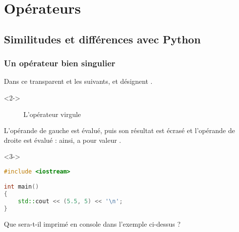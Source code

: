 \documentclass{cppcourses}
\begin{document}
\section{Opérateurs}

\subsection{Similitudes et différences avec Python}

\begin{frame}[fragile]

\frametitle{Un opérateur bien singulier}

Dans ce transparent et les suivants,  et  désignent .

\begin{uncoverenv}<2->

\begin{figure}
\caption{L'opérateur virgule}
\end{figure}

L'opérande de gauche est évalué, puis son résultat est écrasé et l'opérande de droite est évalué : ainsi,  a pour valeur .

\end{uncoverenv}

\begin{example}<3->

\begin{lstlisting}[language = c++]
#include <iostream>

int main()
{
    std::cout << (5.5, 5) << '\n';
}
\end{lstlisting}

Que sera-t-il imprimé en console dans l'exemple ci-dessus ?


\end{example}

\end{frame}
\end{document}
